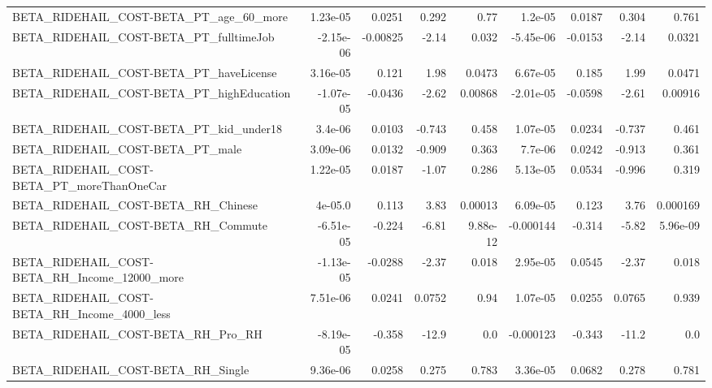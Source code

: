\begin{tabular}{lrrrrrrrr}
BETA\_RIDEHAIL\_COST-BETA\_PT\_age\_60\_more             &    1.23e-05 &       0.0251 &     0.292 &     0.77 &    1.2e-05 &      0.0187 &        0.304 &         0.761 \\
BETA\_RIDEHAIL\_COST-BETA\_PT\_fulltimeJob             &   -2.15e-06 &     -0.00825 &     -2.14 &    0.032 &  -5.45e-06 &     -0.0153 &        -2.14 &        0.0321 \\
BETA\_RIDEHAIL\_COST-BETA\_PT\_haveLicense             &    3.16e-05 &        0.121 &      1.98 &   0.0473 &   6.67e-05 &       0.185 &         1.99 &        0.0471 \\
BETA\_RIDEHAIL\_COST-BETA\_PT\_highEducation           &   -1.07e-05 &      -0.0436 &     -2.62 &  0.00868 &  -2.01e-05 &     -0.0598 &        -2.61 &       0.00916 \\
BETA\_RIDEHAIL\_COST-BETA\_PT\_kid\_under18             &     3.4e-06 &       0.0103 &    -0.743 &    0.458 &   1.07e-05 &      0.0234 &       -0.737 &         0.461 \\
BETA\_RIDEHAIL\_COST-BETA\_PT\_male                    &    3.09e-06 &       0.0132 &    -0.909 &    0.363 &    7.7e-06 &      0.0242 &       -0.913 &         0.361 \\
BETA\_RIDEHAIL\_COST-BETA\_PT\_moreThanOneCar          &    1.22e-05 &       0.0187 &     -1.07 &    0.286 &   5.13e-05 &      0.0534 &       -0.996 &         0.319 \\
BETA\_RIDEHAIL\_COST-BETA\_RH\_Chinese                 &     4e-05.0 &        0.113 &      3.83 &  0.00013 &   6.09e-05 &       0.123 &         3.76 &      0.000169 \\
BETA\_RIDEHAIL\_COST-BETA\_RH\_Commute                 &   -6.51e-05 &       -0.224 &     -6.81 & 9.88e-12 &  -0.000144 &      -0.314 &        -5.82 &      5.96e-09 \\
BETA\_RIDEHAIL\_COST-BETA\_RH\_Income\_12000\_more       &   -1.13e-05 &      -0.0288 &     -2.37 &    0.018 &   2.95e-05 &      0.0545 &        -2.37 &         0.018 \\
BETA\_RIDEHAIL\_COST-BETA\_RH\_Income\_4000\_less        &    7.51e-06 &       0.0241 &    0.0752 &     0.94 &   1.07e-05 &      0.0255 &       0.0765 &         0.939 \\
BETA\_RIDEHAIL\_COST-BETA\_RH\_Pro\_RH                  &   -8.19e-05 &       -0.358 &     -12.9 &      0.0 &  -0.000123 &      -0.343 &        -11.2 &           0.0 \\
BETA\_RIDEHAIL\_COST-BETA\_RH\_Single                  &    9.36e-06 &       0.0258 &     0.275 &    0.783 &   3.36e-05 &      0.0682 &        0.278 &         0.781 \\

\end{tabular}

